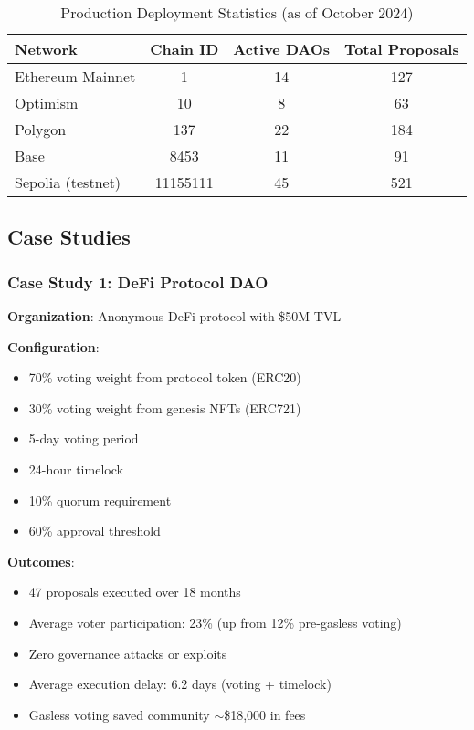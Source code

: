 \documentclass[11pt,a4paper]{article}
\begin{document}
\begin{table}[h]
\centering
\begin{tabular}{|l|c|c|c|}
\hline
\textbf{Network} & \textbf{Chain ID} & \textbf{Active DAOs} & \textbf{Total Proposals} \\
\hline
Ethereum Mainnet & 1 & 14 & 127 \\
Optimism & 10 & 8 & 63 \\
Polygon & 137 & 22 & 184 \\
Base & 8453 & 11 & 91 \\
Sepolia (testnet) & 11155111 & 45 & 521 \\
\hline
\end{tabular}
\caption{Production Deployment Statistics (as of October 2024)}
\end{table}

\subsection{Case Studies}

\subsubsection{Case Study 1: DeFi Protocol DAO}

\textbf{Organization}: Anonymous DeFi protocol with \$50M TVL

\textbf{Configuration}:
\begin{itemize}
    \item 70\% voting weight from protocol token (ERC20)
    \item 30\% voting weight from genesis NFTs (ERC721)
    \item 5-day voting period
    \item 24-hour timelock
    \item 10\% quorum requirement
    \item 60\% approval threshold
\end{itemize}

\textbf{Outcomes}:
\begin{itemize}
    \item 47 proposals executed over 18 months
    \item Average voter participation: 23\% (up from 12\% pre-gasless voting)
    \item Zero governance attacks or exploits
    \item Average execution delay: 6.2 days (voting + timelock)
    \item Gasless voting saved community $\sim$\$18,000 in fees
\end{itemize}
\end{document}
